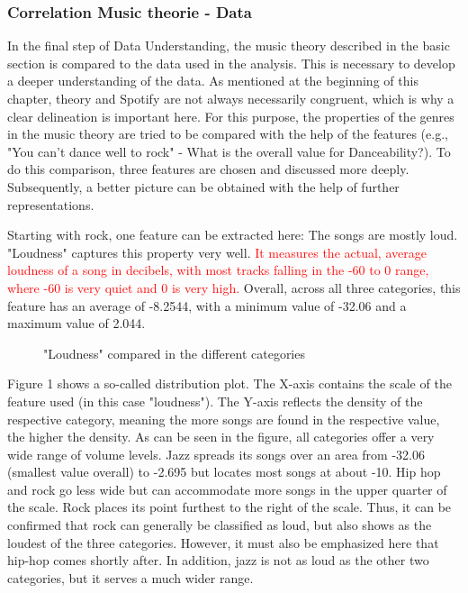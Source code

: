\subsubsection{Correlation Music theorie - Data}
In the final step of Data Understanding,
the music theory described in the basic section is compared to the data used in the analysis.
This is necessary to develop a deeper understanding of the data.
As mentioned at the beginning of this chapter, theory and Spotify are not always necessarily congruent,
which is why a clear delineation is important here.
For this purpose, the properties of the genres in the music theory are tried to be compared
with the help of the features (e.g., "You can't dance well to rock" - What is the overall value for Danceability?).
To do this comparison, three features are chosen and discussed more deeply.
Subsequently, a better picture can be obtained with the help of further representations.

Starting with rock, one feature can be extracted here: The songs are mostly loud.
"Loudness" captures this property very well.
\textcolor{red}{It measures the actual, average loudness of a song in decibels, with most tracks falling
in the -60 to 0 range, where -60 is very quiet and 0 is very high.}
Overall, across all three categories, this feature has an average of -8.2544,
with a minimum value of -32.06 and a maximum value of 2.044.

\begin{figure}[H]
    \centering
    \qquad
    \caption{"Loudness" compared in the different categories}%
    \label{fig:du_dp_bp_ln_categorie_dependent}%
\end{figure}

Figure 1  shows a so-called distribution plot.
The X-axis contains the scale of the feature used (in this case "loudness").
The Y-axis reflects the density of the respective category, meaning the more songs are found in the respective value, the higher the density.
As can be seen in the figure, all categories offer a very wide range of volume levels.
Jazz spreads its songs over an area from -32.06 (smallest value overall) to -2.695 but locates
most songs at about -10. Hip hop and rock go less wide but can accommodate more songs in the upper
quarter of the scale. Rock places its point furthest to the right of the scale.
Thus, it can be confirmed that rock can generally be classified as loud,
but also shows as the loudest of the three categories.
However, it must also be emphasized here that hip-hop comes shortly after.
In addition, jazz is not as loud as the other two categories, but it serves a much wider range. 

